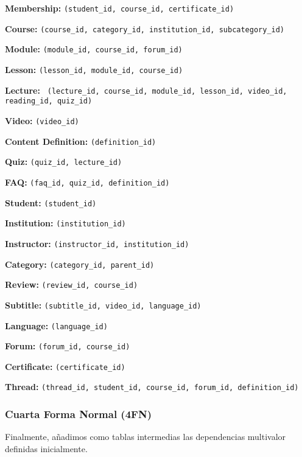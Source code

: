 \documentclass[../main.tex]{subfiles}
\begin{document}
\begin{flushleft}
  \textbf{Membership:} \texttt{(student\_id, course\_id, certificate\_id)}
  
  \textbf{Course:} \texttt{(course\_id, category\_id, institution\_id, subcategory\_id)}
  
  \textbf{Module:} \texttt{(module\_id, course\_id, forum\_id)}
  
  \textbf{Lesson:} \texttt{(lesson\_id, module\_id, course\_id)}
  
  \textbf{Lecture:} \texttt{%
    (lecture\_id, course\_id, module\_id, lesson\_id, video\_id,
    reading\_id, quiz\_id)
  }

  \textbf{Video:} \texttt{(video\_id)}

  \textbf{Content Definition:} \texttt{(definition\_id)}

  \textbf{Quiz:} \texttt{(quiz\_id, lecture\_id)}

  \textbf{FAQ:} \texttt{(faq\_id, quiz\_id, definition\_id)}

  \textbf{Student:} \texttt{(student\_id)}

  \textbf{Institution:} \texttt{(institution\_id)}

  \textbf{Instructor:} \texttt{(instructor\_id, institution\_id)}

  \textbf{Category:} \texttt{(category\_id, parent\_id)}

  \textbf{Review:} \texttt{(review\_id, course\_id)}
  
  \textbf{Subtitle:} \texttt{(subtitle\_id, video\_id, language\_id)}
  
  \textbf{Language:} \texttt{(language\_id)}
  
  \textbf{Forum:} \texttt{(forum\_id, course\_id)}
  
  \textbf{Certificate:} \texttt{(certificate\_id)}
  
  \textbf{Thread:} \texttt{(thread\_id, student\_id, course\_id, forum\_id, definition\_id)}
\end{flushleft}

\subsubsection{Cuarta Forma Normal (4FN)}

Finalmente, añadimos como tablas intermedias las dependencias
multivalor definidas inicialmente.
\end{document}
